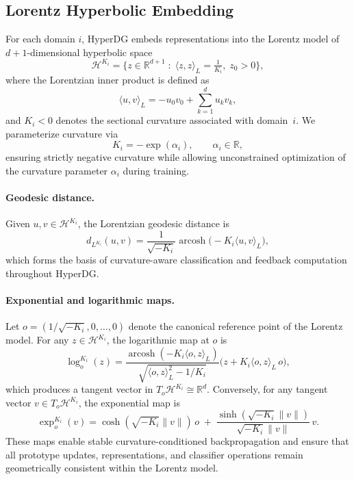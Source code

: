 \documentclass[10pt]{article} %
\begin{document}
\subsection{Lorentz Hyperbolic Embedding}
\label{sec:hyp-embed}

For each domain $i$, HyperDG embeds representations into the Lorentz model of
$d{+}1$-dimensional hyperbolic space
\[
\mathcal{H}^{K_i}
=
\Big\{
z \in \mathbb{R}^{d+1}
\;:\;
\langle z,z\rangle_L = \tfrac{1}{K_i},\; z_0 > 0
\Big\},
\]
where the Lorentzian inner product is defined as
\[
\langle u, v\rangle_L = -u_0 v_0 + \sum_{k=1}^{d} u_k v_k,
\]
and $K_i < 0$ denotes the sectional curvature associated with domain~$i$.
We parameterize curvature via
\[
K_i = -\exp(\alpha_i), \qquad \alpha_i \in \mathbb{R},
\]
ensuring strictly negative curvature while allowing unconstrained optimization of
the curvature parameter $\alpha_i$ during training.

\paragraph{Geodesic distance.}
Given $u, v \in \mathcal{H}^{K_i}$, the Lorentzian geodesic distance is
\begin{equation}
d_{L^{K_i}}(u, v)
=
\frac{1}{\sqrt{-K_i}}
\operatorname{arcosh}\!\big( -K_i \langle u, v\rangle_L \big),
\label{eq:lorentz-dist}
\end{equation}
which forms the basis of curvature-aware classification and feedback
computation throughout HyperDG.

\paragraph{Exponential and logarithmic maps.}
Let $o = (1/\sqrt{-K_i}, 0, \dots, 0)$ denote the canonical reference point of
the Lorentz model. For any $z \in \mathcal{H}^{K_i}$, the logarithmic map at $o$
is
\[
\log_{o}^{K_i}(z)
=
\frac{
\operatorname{arcosh}(-K_i \langle o, z\rangle_L)
}{
\sqrt{\langle o,z\rangle_L^{2} - 1/K_i}
}
\Big(z + K_i \langle o,z\rangle_L \, o\Big),
\]
which produces a tangent vector in $T_o\mathcal{H}^{K_i}\cong\mathbb{R}^d$.
Conversely, for any tangent vector $v \in T_o\mathcal{H}^{K_i}$, the exponential
map is
\[
\exp_{o}^{K_i}(v)
=
\cosh(\sqrt{-K_i}\|v\|)\, o
\;+\;
\frac{\sinh(\sqrt{-K_i}\|v\|)}{\sqrt{-K_i}\|v\|}\, v.
\]
These maps enable stable curvature-conditioned backpropagation and ensure that
all prototype updates, representations, and classifier operations remain
geometrically consistent within the Lorentz model.
\end{document}
